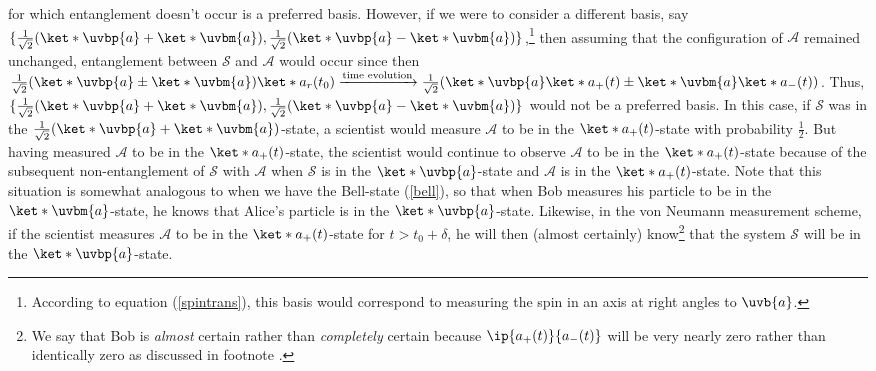 \documentclass[12pt]{report}
\begin{document}
    for which entanglement doesn't occur is a preferred basis. However, if we were to consider a different basis, say $\{\frac{1}{\sqrt{2}}(\ket*{\uvbp{a}}+\ket*{\uvbm{a}}), \frac{1}{\sqrt{2}}(\ket*{\uvbp{a}}-\ket*{\uvbm{a}})\}$,\footnote{According to equation (\ref{spintrans}), this basis would correspond to measuring the spin in an axis at right angles to 
    $\uvb{a}$.} then assuming that the configuration of $\mathcal{A}$ remained unchanged, entanglement between $\mathcal{S}$ and $\mathcal{A}$ would occur since then 
    $\frac{1}{\sqrt{2}}(\ket*{\uvbp{a}}\pm\ket*{\uvbm{a}})\ket*{a_r(t_0)}\xrightarrow{\text{time evolution}}\frac{1}{\sqrt{2}}(\ket*{\uvbp{a}}\ket*{a_+(t)}\pm\ket*{\uvbm{a}}\ket*{a_-(t)})$. Thus, $\{\frac{1}{\sqrt{2}}(\ket*{\uvbp{a}}+\ket*{\uvbm{a}}), \frac{1}{\sqrt{2}}(\ket*{\uvbp{a}}-\ket*{\uvbm{a}})\}$ would not be a preferred basis. In this case, if  $\mathcal{S}$ was in the $\frac{1}{\sqrt{2}}(\ket*{\uvbp{a}}+\ket*{\uvbm{a}})$-state, a scientist would measure $\mathcal{A}$ to be in the $\ket*{a_+(t)}$-state with probability $\frac{1}{2}$. But having measured $\mathcal{A}$ to be in the $\ket*{a_+(t)}$-state, the scientist would continue to observe $\mathcal{A}$ to be in the $\ket*{a_+(t)}$-state because of the subsequent non-entanglement of $\mathcal{S}$ with $\mathcal{A}$ when $\mathcal{S}$ is in the   $\ket*{\uvbp{a}}$-state and $\mathcal{A}$ is in the $\ket*{a_+(t)}$-state. Note that this situation is somewhat analogous to when we have the Bell-state (\ref{bell}), so that when Bob measures his particle to be in the $\ket*{\uvbm{a}}$-state, he knows that Alice's particle is in the $\ket*{\uvbp{a}}$-state. Likewise, in the von Neumann measurement scheme, if the scientist measures $\mathcal{A}$ to be in the $\ket*{a_+(t)}$-state for $t>t_0+\delta$, he will then (almost certainly) know\footnote{We say that Bob is \emph{almost} certain rather than \emph{completely} certain because $\ip{a_+(t)}{a_-(t)}$ will be very nearly zero rather than identically zero as discussed in footnote .} that the system $\mathcal{S}$ will be in the $\ket*{\uvbp{a}}$-state.
    
\end{document}
